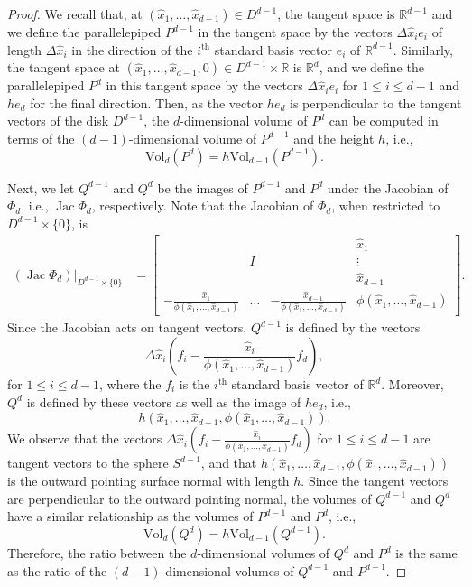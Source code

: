 \documentclass[twoside,11pt]{article}
\newcommand{\R}{{\mathbb R}}
\newcommand{\VV}[2]{\text{Vol}_{#2}\left( #1 \right)}
\DeclareMathOperator{\Jac}{Jac}
\begin{document}
\begin{proof}
We recall that, at $(\hat{x}_1,\dots,\hat{x}_{d-1})\in D^{d-1}$, the tangent space is $\mathbb{R}^{d-1}$ and we define the parallelepiped $P^{d-1}$ in the tangent space by the vectors $\Delta \hat{x}_i e_i$ of length $\Delta \hat{x}_i$ in the direction of the $i^{\text{th}}$ standard basis vector $e_i$ of $\R^{d-1}$.  Similarly, the tangent space at $(\hat{x}_1,\dots,\hat{x}_{d-1},0)\in D^{d-1}\times\R$ is $\mathbb{R}^d$, and we define the parallelepiped $P^d$ in this tangent space by the vectors $\Delta \hat{x}_i e_i$ for $1\leq i\leq d-1$ and $he_d$ for the final direction.  Then, as the vector $he_d$ is perpendicular to the tangent vectors 
			of the disk $D^{d-1}$, the $d$-dimensional volume of $P^d$ can be computed in terms of the $(d-1)$-dimensional volume of $P^{d-1}$ and the height $h$, i.e.,
				\begin{equation*} 
				\VV{P^d}{d} = h \VV{P^{d-1}}{d-1}.
				\end{equation*}

			Next, we let $Q^{d-1}$ and $Q^d$ be the images of $P^{d-1}$ and $P^d$ under the Jacobian of $\Phi_d$, i.e., $\Jac\Phi_d$, respectively.  Note that the Jacobian of $\Phi_d$, when restricted to $D^{d-1} \times \{0\}$, is
			\begin{align*}
			\left(\Jac \Phi_d \right)|_{D^{d-1} \times \{0\}} & =  
					\left[
					\begin{array}{ccc|c}
					&&&\hat{x}_1 \\[.5cm]
					&I&&\vdots\\[.5cm]
					&&& \hat{x}_{d-1} \\[.3cm]\hline
					-\frac{ \hat{x}_1}{\phi(\hat{x}_1, \ldots, \hat{x}_{d-1})}&\dots&-\frac{ \hat{x}_{d-1}}{\phi(\hat{x}_1, \ldots, \hat{x}_{d-1})}& \phi(\hat{x}_1, \ldots, \hat{x}_{d-1})
					\end{array}
					\right].
				\end{align*}
				Since the Jacobian acts on tangent vectors, $Q^{d-1}$ is defined by the vectors 	
				\[\Delta \hat{x}_i \left(f_i - \frac{\hat{x}_i}{\phi(\hat{x}_1, \ldots, \hat{x}_{d-1})}f_d\right),\]
			for $1\leq i\leq d-1$, where the $f_i$ is the $i^{\text{th}}$ standard basis vector of $\mathbb{R}^d$.
			Moreover, $Q^d$ is defined by these vectors as well as the image of $he_d$, i.e., 
								\[h\left( \hat{x}_1, \ldots,\hat{x}_{d-1}, \phi(\hat{x}_1, \ldots, \hat{x}_{d-1} )\right) .\]
			We observe that the vectors $\Delta \hat{x}_i \left(f_i - \frac{\hat{x}_i}{\phi(\hat{x}_1, \ldots, \hat{x}_{d-1})}f_d\right)$ for $1\leq i \leq d-1$ are tangent vectors to the sphere $S^{d-1}$, 
			and 
			that $h\left( \hat{x}_1, \ldots,\hat{x}_{d-1}, \phi(\hat{x}_1, \ldots, \hat{x}_{d-1} )\right)$ is the outward pointing surface normal with length $h$.  Since the tangent vectors are perpendicular to the outward pointing normal, the volumes of $Q^{d-1}$ and $Q^d$ have a similar relationship as the volumes of $P^{d-1}$ and $P^d$, i.e., 
				\begin{equation*}
				\VV{Q^d}{d} = h \VV{Q^{d-1}}{d-1}.
				\end{equation*}
				Therefore, the ratio between the $d$-dimensional volumes of $Q^d$ and $P^d$ is the same as the ratio of the $(d-1)$-dimensional volumes of $Q^{d-1}$ and $P^{d-1}$.
					

\end{proof}
\end{document}
